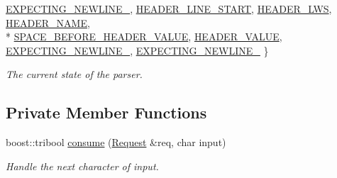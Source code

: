 \begin{DoxyCompactItemize}
\hyperlink{classwebsocket_1_1http_1_1RequestParser_af1ad2d57d234f4ac8fb9d9656bd9c8b2a0ecb8fa46bfea7771c71c58f41268bf0}{E\+X\+P\+E\+C\+T\+I\+N\+G\+\_\+\+N\+E\+W\+L\+I\+N\+E\+\_}, 
\hyperlink{classwebsocket_1_1http_1_1RequestParser_af1ad2d57d234f4ac8fb9d9656bd9c8b2aaea516ce1ac4d13a17fd513eef0ce3e1}{H\+E\+A\+D\+E\+R\+\_\+\+L\+I\+N\+E\+\_\+\+S\+T\+A\+RT}, 
\hyperlink{classwebsocket_1_1http_1_1RequestParser_af1ad2d57d234f4ac8fb9d9656bd9c8b2afc5f5b7a38b8f357143b95e9dff55981}{H\+E\+A\+D\+E\+R\+\_\+\+L\+WS}, 
\hyperlink{classwebsocket_1_1http_1_1RequestParser_af1ad2d57d234f4ac8fb9d9656bd9c8b2ab658ce46b6c2c18e7f22cbdc288124a4}{H\+E\+A\+D\+E\+R\+\_\+\+N\+A\+ME}, 
\\*
\hyperlink{classwebsocket_1_1http_1_1RequestParser_af1ad2d57d234f4ac8fb9d9656bd9c8b2a7d96b53f34b2f5734fc4219312e08303}{S\+P\+A\+C\+E\+\_\+\+B\+E\+F\+O\+R\+E\+\_\+\+H\+E\+A\+D\+E\+R\+\_\+\+V\+A\+L\+UE}, 
\hyperlink{classwebsocket_1_1http_1_1RequestParser_af1ad2d57d234f4ac8fb9d9656bd9c8b2a834d3f769b7d8f936e1db3ff09311580}{H\+E\+A\+D\+E\+R\+\_\+\+V\+A\+L\+UE}, 
\hyperlink{classwebsocket_1_1http_1_1RequestParser_af1ad2d57d234f4ac8fb9d9656bd9c8b2a382a9876ff19c807c19ca3d81d379f74}{E\+X\+P\+E\+C\+T\+I\+N\+G\+\_\+\+N\+E\+W\+L\+I\+N\+E\+\_}, 
\hyperlink{classwebsocket_1_1http_1_1RequestParser_af1ad2d57d234f4ac8fb9d9656bd9c8b2ab3f9a5a7482ec9b941a93ad9490b1b24}{E\+X\+P\+E\+C\+T\+I\+N\+G\+\_\+\+N\+E\+W\+L\+I\+N\+E\+\_}
 \}\begin{DoxyCompactList}\small\item\em The current state of the parser. \end{DoxyCompactList}
\end{DoxyCompactItemize}
\subsection*{Private Member Functions}
\begin{DoxyCompactItemize}
\item 
boost\+::tribool \hyperlink{classwebsocket_1_1http_1_1RequestParser_acb68b2ddadf42677684af022d2eab05a}{consume} (\hyperlink{structwebsocket_1_1http_1_1Request}{Request} \&req, char input)
\begin{DoxyCompactList}\small\item\em Handle the next character of input. \end{DoxyCompactList}\end{DoxyCompactItemize}

